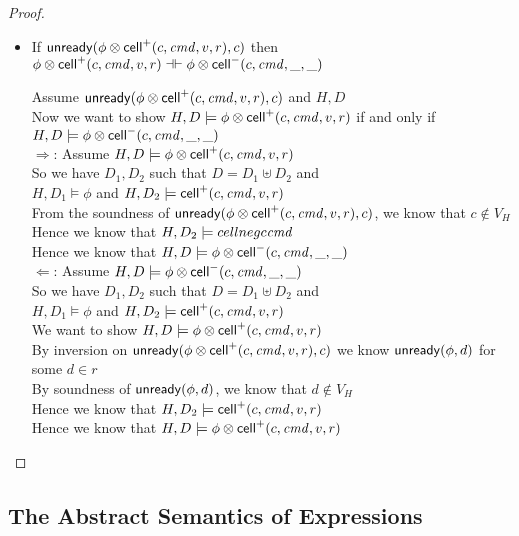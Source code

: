 \begin{proof}
\begin{itemize}
\item If $\mathsf{unready}({\phi \otimes \mathsf{cell}^{+}({c}, {\mathit{cmd}}, {v}, {r})}, {c})$ then $\phi \otimes \mathsf{cell}^{+}({c}, {\mathit{cmd}}, {v}, {r}) \dashv\vdash \phi \otimes \mathsf{cell}^{-}({c}, {\mathit{cmd}}, {\_}, {\_})$
\begin{tabbedproof}
\oo Assume $\mathsf{unready}({\phi \otimes \mathsf{cell}^{+}({c}, {\mathit{cmd}}, {v}, {r})}, {c})$  and $H, D$ \\
\oo Now we want to show $H, D \models \phi \otimes \mathsf{cell}^{+}({c}, {\mathit{cmd}}, {v}, {r})$ if and only if \\
\ox $H, D \models \phi \otimes \mathsf{cell}^{-}({c}, {\mathit{cmd}}, {\_}, {\_})$ \\
\oo $\Rightarrow$: Assume $H, D \models \phi \otimes \mathsf{cell}^{+}({c}, {\mathit{cmd}}, {v}, {r})$ \\
\ooo So we have $D_1, D_2$ such that $D = D_1 \uplus D_2$ and \\
\oox $H, D_1 \models \phi$ and $H, D_2 \models \mathsf{cell}^{+}({c}, {\mathit{cmd}}, {v}, {r})$ \\
\ooo From the soundness of $\mathsf{unready}({\phi \otimes \mathsf{cell}^{+}({c}, {\mathit{cmd}}, {v}, {r})}, {c})$, we know that $c \not \in V_H$ \\
\ooo Hence we know that $H, D_2 \models cellneg{c}{\mathit{cmd}}$ \\
\ooo Hence we know that $H, D \models \phi \otimes \mathsf{cell}^{-}({c}, {\mathit{cmd}}, {\_}, {\_})$ \\
\oo $\Leftarrow$: Assume $H, D \models \phi \otimes \mathsf{cell}^{-}({c}, {\mathit{cmd}}, {\_}, {\_})$ \\
\ooo So we have $D_1, D_2$ such that $D = D_1 \uplus D_2$ and \\
\oox $H, D_1 \models \phi$ and $H, D_2 \models \mathsf{cell}^{+}({c}, {\mathit{cmd}}, {v}, {r})$ \\
\ooo We want to show $H, D \models \phi \otimes \mathsf{cell}^{+}({c}, {\mathit{cmd}}, {v}, {r})$ \\
\ooo By inversion on $\mathsf{unready}({\phi \otimes \mathsf{cell}^{+}({c}, {\mathit{cmd}}, {v}, {r})}, {c})$ we know $\mathsf{unready}({\phi}, {d})$ for some $d \in r$ \\
\ooo By soundness of $\mathsf{unready}({\phi}, {d})$, we know that $d \not\in V_H$ \\
\ooo Hence we know that $H, D_2 \models \mathsf{cell}^{+}({c}, {\mathit{cmd}}, {v}, {r})$ \\
\ooo Hence we know that $H, D \models \phi \otimes \mathsf{cell}^{+}({c}, {\mathit{cmd}}, {v}, {r})$ \\
\end{tabbedproof}
\end{itemize}
\end{proof}



\subsection{The Abstract Semantics of Expressions}

